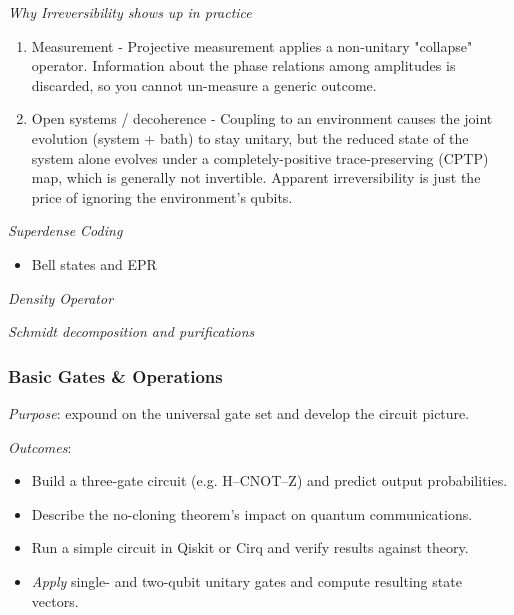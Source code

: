 \emph{Why Irreversibility shows up in practice}
\begin{enumerate}
	\item Measurement - Projective measurement applies a non-unitary "collapse" operator. 
	Information about the phase relations among amplitudes is discarded, so you cannot un-measure a generic outcome.

	\item Open systems / decoherence - Coupling to an environment causes the joint evolution (system + bath) to stay unitary, 
	but the reduced state of the system alone evolves under a completely-positive trace-preserving (CPTP) map, 
	which is generally not invertible. 
	Apparent irreversibility is just the price of ignoring the environment's qubits.
\end{enumerate}

\emph{Superdense Coding}
\begin{itemize}
	\item Bell states and EPR
\end{itemize}

\emph{Density Operator}

\emph{Schmidt decomposition and purifications}

\subsubsection*{Basic Gates \& Operations}

\emph{Purpose}: expound on the universal gate set and develop the circuit picture.

\emph{Outcomes}:
\begin{itemize}
	\item Build a three-gate circuit (e.g. H–CNOT–Z) and predict output probabilities.
	\item Describe the no-cloning theorem's impact on quantum communications.
	\item Run a simple circuit in Qiskit or Cirq and verify results against theory.
	\item \emph{Apply} single- and two-qubit unitary gates and compute resulting state vectors.
\end{itemize}

